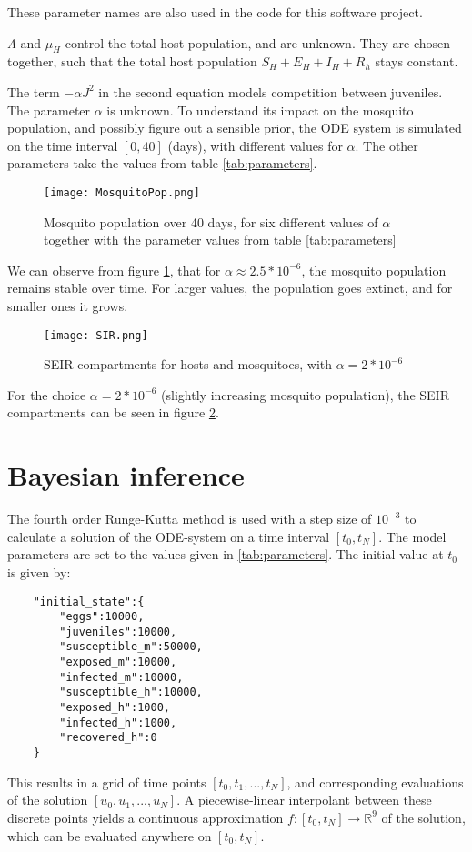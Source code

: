 \documentclass{article}
\begin{document}
These parameter names are also used in the code for this software project.

$\Lambda$ and $\mu_H$ control the total host population, and are unknown. They are chosen together, such that the total host population $S_H + E_H + I_H + R_h$ stays constant. 

The term $-\alpha J^2$ in the second equation models competition between juveniles. The parameter $\alpha$ is unknown. To understand its impact on the mosquito population, and possibly figure out a sensible prior, the ODE system is simulated on the time interval $[0,40]$ (days), with different values for $\alpha$. The other parameters take the values from table \ref{tab:parameters}.

\begin{figure}
    \centering
    \texttt{[image: MosquitoPop.png]}
    \caption{Mosquito population over 40 days, for six different values of $\alpha$ together with the parameter values from table \ref{tab:parameters}}
    \label{mosquitoPopulation}
\end{figure}

We can observe from figure \ref{mosquitoPopulation}, that for $\alpha \approx 2.5*10^{-6}$, the mosquito population remains stable over time. For larger values, the population goes extinct, and for smaller ones it grows. 

\begin{figure}
    \centering
    \texttt{[image: SIR.png]}
    \caption{SEIR compartments for hosts and mosquitoes, with $\alpha = 2*10^{-6}$}
    \label{SIR}
\end{figure}

For the choice $\alpha = 2*10^{-6}$ (slightly increasing mosquito population), the SEIR compartments can be seen in figure \ref{SIR}. 

\section{Bayesian inference}
The fourth order Runge-Kutta method is used with a step size of $10^{-3}$ to calculate a solution of the ODE-system on a time interval $[t_0, t_N]$. The model parameters are set to the values given in \ref{tab:parameters}. The initial value at $t_0$ is given by:
\begin{verbatim}
    "initial_state":{
        "eggs":10000,
        "juveniles":10000,
        "susceptible_m":50000,
        "exposed_m":10000,
        "infected_m":10000,
        "susceptible_h":10000,
        "exposed_h":1000,
        "infected_h":1000,
        "recovered_h":0
    }
\end{verbatim}
This results in a grid of time points $[t_0, t_1, ..., t_N]$, and corresponding evaluations of the solution $[u_0, u_1, ..., u_N]$. A piecewise-linear interpolant between these discrete points yields a continuous approximation $f:[t_0,t_N]\rightarrow \mathbb{R}^9 $ of the solution, which can be evaluated anywhere on $[t_0, t_N]$.
\end{document}
